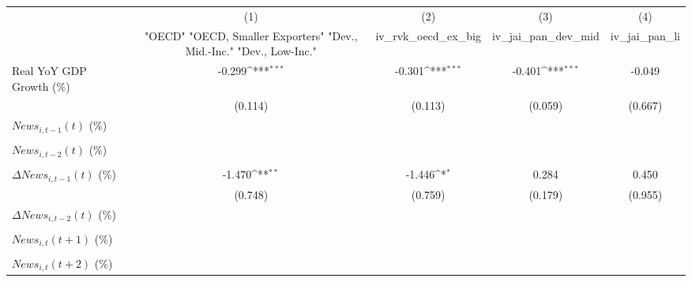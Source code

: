 {
\def\sym#1{\ifmmode^{#1}\else\(^{#1}\)\fi}
\begin{tabular}{l*{4}{c}}
\toprule
                    &\multicolumn{1}{c}{(1)}&\multicolumn{1}{c}{(2)}&\multicolumn{1}{c}{(3)}&\multicolumn{1}{c}{(4)}\\
                    &\multicolumn{1}{c}{ "OECD" "OECD, Smaller Exporters" "Dev., Mid.-Inc." "Dev., Low-Inc."}&\multicolumn{1}{c}{iv_rvk_oecd_ex_big}&\multicolumn{1}{c}{iv_jai_pan_dev_mid}&\multicolumn{1}{c}{iv_jai_pan_li}\\
\midrule
Real YoY GDP Growth (\%)&      -0.299\sym{***}&      -0.301\sym{***}&      -0.401\sym{***}&      -0.049         \\
                    &     (0.114)         &     (0.113)         &     (0.059)         &     (0.667)         \\
\addlinespace
$ News_{i,t-1}(t)$ (\%)&                     &                     &                     &                     \\
                    &                     &                     &                     &                     \\
\addlinespace
$ News_{i,t-2}(t)$ (\%)&                     &                     &                     &                     \\
                    &                     &                     &                     &                     \\
\addlinespace
$ \Delta News_{i,t-1}(t)$ (\%)&      -1.470\sym{**} &      -1.446\sym{*}  &       0.284         &       0.450         \\
                    &     (0.748)         &     (0.759)         &     (0.179)         &     (0.955)         \\
\addlinespace
$ \Delta News_{i,t-2}(t)$ (\%)&                     &                     &                     &                     \\
                    &                     &                     &                     &                     \\
\addlinespace
$ News_{i,t}(t+1)$ (\%)&                     &                     &                     &                     \\
                    &                     &                     &                     &                     \\
\addlinespace
$ News_{i,t}(t+2)$ (\%)&                     &                     &                     &                     \\

\end{tabular}}

